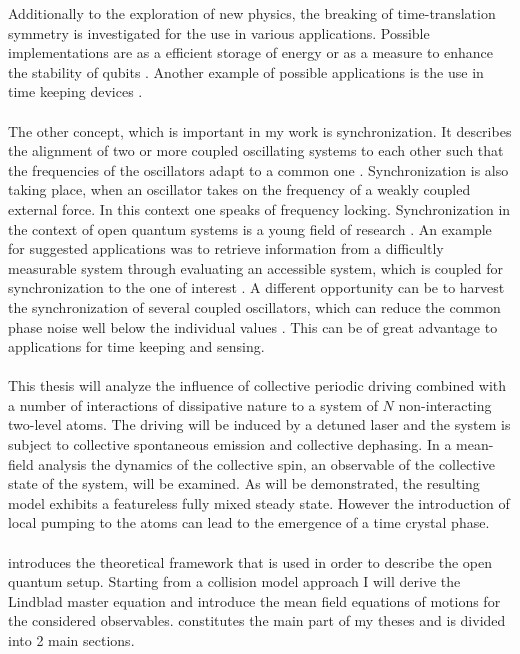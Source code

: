 Additionally to the exploration of new physics, the breaking of time-translation symmetry is investigated for the use in various applications. Possible implementations are as a efficient storage of energy \cite{paulino_thermodynamics_2025} or as a measure to enhance the stability of qubits \cite{barnes_stabilization_2019,qiao_floquet-enhanced_2021}. Another example of possible applications is the use in time keeping devices \cite{taheri_all-optical_2022}.\\\\
The other concept, which is important in my work is synchronization. It describes the alignment of two or more coupled oscillating systems to each other such that the frequencies of the oscillators adapt to a common one \cite{pikovskij_synchronization_2007}. Synchronization is also taking place, when an oscillator takes on the frequency of a weakly coupled external force. In this context one speaks of frequency locking. Synchronization in the context of open quantum systems is a young field of research \cite{galve_quantum_2017}. An example for suggested applications was to retrieve information from a difficultly measurable system through evaluating an accessible system, which is coupled for synchronization to the one of interest \cite{giorgi_probing_2016}. A different opportunity can be to harvest the synchronization of several coupled oscillators, which can reduce the common phase noise well below the individual values \cite{zhang_synchronization_2015,matheny_phase_2014}. This can be of great advantage to applications for time keeping and sensing.\\\\
This thesis will analyze the influence of collective periodic driving combined with a number of interactions of dissipative nature to a system of $N$ non-interacting two-level atoms. The driving will be induced by a detuned laser and the system is subject to collective spontaneous emission and collective dephasing. %
In a mean-field analysis the dynamics of the collective spin, an observable of the collective state of the system, will be examined. As will be demonstrated, the resulting model exhibits a featureless fully mixed steady state. However the introduction of local pumping to the atoms can lead to the emergence of a time crystal phase.\\\\
 introduces the theoretical framework that is used in order to describe the open quantum setup. Starting from a collision model approach I will derive the Lindblad master equation and introduce the mean field equations of motions for the considered observables.  constitutes the main part of my theses and is divided into 2 main sections. 

